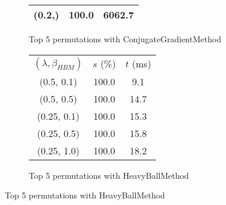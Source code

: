 \begin{figure}[H]
\begin{subfigure}[ht]{.5\textwidth}
\begin{tabular}{|c|c|c|}
(0.2,) & 100.0 & 6062.7 \\
\hline
\end{tabular}
\caption{Top 5 permutations with ConjugateGradientMethod}
\label{subfig:param_comp_NegativeEntropy_ConjugateGradientMethod_ConstantSearch}
\end{subfigure}
\hfill
\begin{subfigure}[ht]{.5\textwidth}
\begin{tabular}{|c|c|c|}
\hline
\rowcolor{gray!25}
\multicolumn{3}{|c|}{HeavyBallMethod} \\
\hline
\rowcolor{gray!25}
$(\lambda,\beta_{HBM})$ & $s$ (\%) & $t$ (ms) \\
\hline
(0.5, 0.1) & 100.0 & 9.1 \\
(0.5, 0.5) & 100.0 & 14.7 \\
(0.25, 0.1) & 100.0 & 15.3 \\
(0.25, 0.5) & 100.0 & 15.8 \\
(0.25, 1.0) & 100.0 & 18.2 \\
\hline
\end{tabular}
\caption{Top 5 permutations with HeavyBallMethod}
\label{subfig:param_comp_NegativeEntropy_HeavyBallMethod_ConstantSearch}
\end{subfigure}
\end{figure}